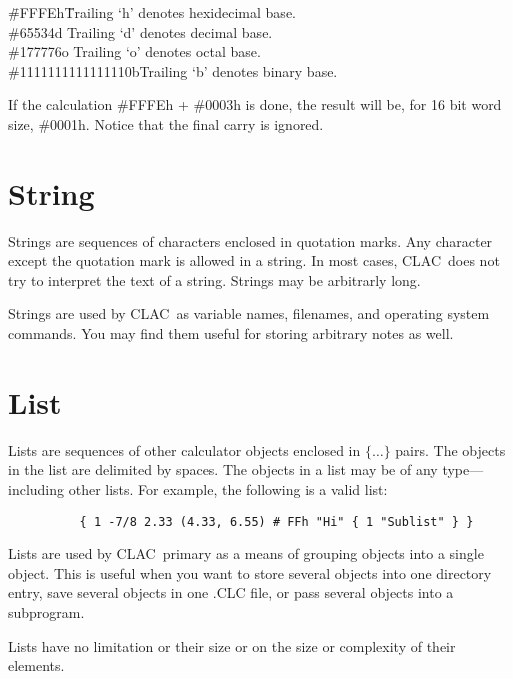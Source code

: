\documentclass{report}
\newcommand{\CLAC}{CLAC}
\begin{document}
\begin{tabbing}

\hspace*{3em}\=\#FFFEh\hspace{6em}\=Trailing `h' denotes hexidecimal base.\\
\>             \#65534d\>           Trailing `d' denotes decimal base.\\
\>             \#177776o\>          Trailing `o' denotes octal base.\\
\>             \#1111111111111110b\>Trailing `b' denotes binary base.

\end{tabbing}

If the calculation \#FFFEh + \#0003h is done, the result will be, for 16
bit word size, \#0001h. Notice that the final carry is ignored.

\section{String}

Strings are sequences of characters enclosed in quotation marks. Any
character except the quotation mark is allowed in a string. In most
cases, \CLAC\ does not try to interpret the text of a string. Strings
may be arbitrarly long.

Strings are used by \CLAC\ as variable names, filenames, and operating
system commands. You may find them useful for storing arbitrary notes as
well.

\section{List}

Lists are sequences of other calculator objects enclosed in $\{\ldots\}$
pairs. The objects in the list are delimited by spaces. The objects in a
list may be of any type---including other lists. For example, the
following is a valid list:

\begin{verbatim}
          { 1 -7/8 2.33 (4.33, 6.55) # FFh "Hi" { 1 "Sublist" } }
\end{verbatim}

Lists are used by \CLAC\ primary as a means of grouping objects into a
single object. This is useful when you want to store several objects
into one directory entry, save several objects in one .CLC file, or pass
several objects into a subprogram.

Lists have no limitation or their size or on the size or complexity of
their elements.
\end{document}
